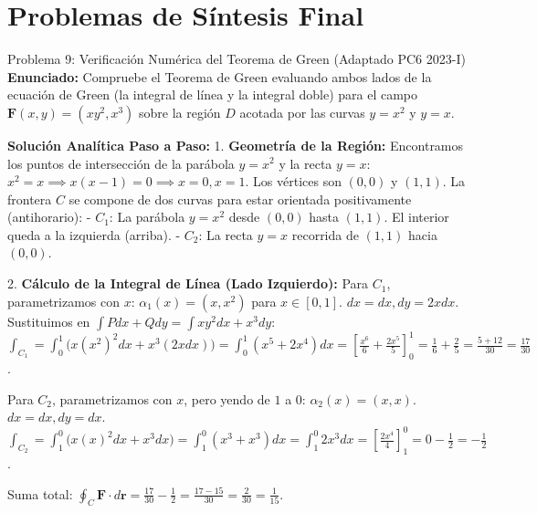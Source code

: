 \documentclass[11pt,a4paper]{article}
\begin{document}
\section{Problemas de Síntesis Final}

\begin{ejerciciobox}{Problema 9: Verificación Numérica del Teorema de Green (Adaptado PC6 2023-I)}
\textbf{Enunciado:}
Compruebe el Teorema de Green evaluando ambos lados de la ecuación de Green (la integral de línea y la integral doble) para el campo $\mathbf{F}(x,y) = (xy^2, x^3)$ sobre la región $D$ acotada por las curvas $y = x^2$ y $y = x$.

\textbf{Solución Analítica Paso a Paso:}
1. \textbf{Geometría de la Región:}
Encontramos los puntos de intersección de la parábola $y=x^2$ y la recta $y=x$:
$x^2 = x \implies x(x-1) = 0 \implies x=0, x=1$.
Los vértices son $(0,0)$ y $(1,1)$.
La frontera $C$ se compone de dos curvas para estar orientada positivamente (antihorario):
- $C_1$: La parábola $y=x^2$ desde $(0,0)$ hasta $(1,1)$. El interior queda a la izquierda (arriba).
- $C_2$: La recta $y=x$ recorrida de $(1,1)$ hacia $(0,0)$.

2. \textbf{Cálculo de la Integral de Línea (Lado Izquierdo):}
Para $C_1$, parametrizamos con $x$: $\alpha_1(x) = (x, x^2)$ para $x \in [0,1]$.
$dx = dx, dy = 2x dx$.
Sustituimos en $\int P dx + Q dy = \int xy^2 dx + x^3 dy$:
$\int_{C_1} = \int_0^1 \big( x(x^2)^2 dx + x^3(2x dx) \big) = \int_0^1 (x^5 + 2x^4) dx = \left[ \frac{x^6}{6} + \frac{2x^5}{5} \right]_0^1 = \frac{1}{6} + \frac{2}{5} = \frac{5+12}{30} = \frac{17}{30}$.

Para $C_2$, parametrizamos con $x$, pero yendo de $1$ a $0$: $\alpha_2(x) = (x, x)$.
$dx = dx, dy = dx$.
$\int_{C_2} = \int_1^0 \big( x(x)^2 dx + x^3 dx \big) = \int_1^0 (x^3 + x^3) dx = \int_1^0 2x^3 dx = \left[ \frac{2x^4}{4} \right]_1^0 = 0 - \frac{1}{2} = -\frac{1}{2}$.

Suma total: $\oint_C \mathbf{F}\cdot d\mathbf{r} = \frac{17}{30} - \frac{1}{2} = \frac{17 - 15}{30} = \frac{2}{30} = \frac{1}{15}$.


\end{ejerciciobox}
\end{document}
